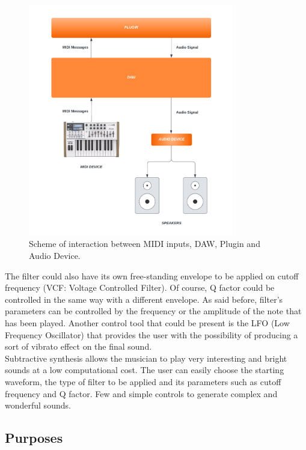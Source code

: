 \documentclass{article}
\begin{document}
\begin{figure}[H]
\centering
 \includegraphics[width=0.8\textwidth]{DSP System Scheme.png}
  \caption{Scheme of interaction between MIDI inputs, DAW, Plugin and Audio Device.}
\end{figure}
The filter could also have its own free-standing envelope to be applied on cutoff frequency (VCF: Voltage Controlled Filter). Of course, Q factor could be controlled in the same way with a different envelope.
As said before, filter’s parameters can be controlled by the frequency or the amplitude of the note that has been played. Another control tool that could be present is the LFO (Low Frequency Oscillator) that provides the user with the possibility of producing a sort of vibrato effect on the final sound.
\\Subtractive synthesis allows the musician to play very interesting and bright sounds at a low computational cost. The user can easily choose the starting waveform, the type of filter to be applied and its parameters such as cutoff frequency and Q factor. Few and simple controls to generate complex and wonderful sounds.


\subsection{Purposes}
\end{document}
